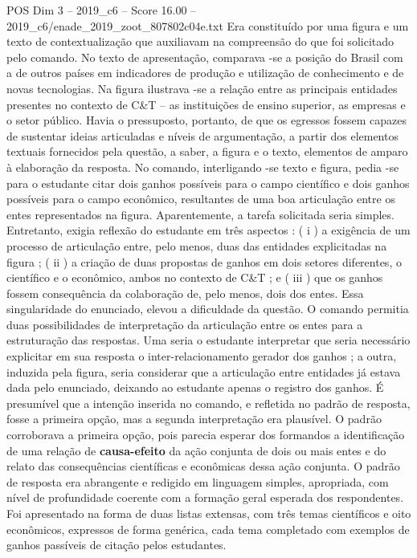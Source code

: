 \begin{textsample}{POS Dim 3 – 2019\_c6 – Score 16.00 – 2019\_c6/enade\_2019\_zoot\_807802c04e.txt}
Era constituído por uma figura e um texto de contextualização que auxiliavam na compreensão do que foi solicitado pelo comando.
No texto de apresentação, comparava -se a posição do Brasil com a de outros países em indicadores de produção e utilização de conhecimento e de novas tecnologias.
Na figura ilustrava -se a relação entre as principais entidades presentes no contexto de C\&T – as instituições de ensino superior, as empresas e o setor público.
Havia o pressuposto, portanto, de que os egressos fossem capazes de sustentar ideias articuladas e níveis de argumentação, a partir dos elementos textuais fornecidos pela questão, a saber, a figura e o texto, elementos de amparo à elaboração da resposta.
No comando, interligando -se texto e figura, pedia -se para o estudante citar dois ganhos possíveis para o campo científico e dois ganhos possíveis para o campo econômico, resultantes de uma boa articulação entre os entes representados na figura.
Aparentemente, a tarefa solicitada seria simples.
Entretanto, exigia reflexão do estudante em três aspectos : ( i ) a exigência de um processo de articulação entre, pelo menos, duas das entidades explicitadas na figura ; ( ii ) a criação de duas propostas de ganhos em dois setores diferentes, o científico e o econômico, ambos no contexto de C\&T ; e ( iii ) que os ganhos fossem consequência da colaboração de, pelo menos, dois dos entes.
Essa singularidade do enunciado, elevou a dificuldade da questão.
O comando permitia duas possibilidades de interpretação da articulação entre os entes para a estruturação das respostas.
Uma seria o estudante interpretar que seria necessário explicitar em sua resposta o inter-relacionamento gerador dos ganhos ; a outra, induzida pela figura, seria considerar que a articulação entre entidades já estava dada pelo enunciado, deixando ao estudante apenas o registro dos ganhos.
É presumível que a intenção inserida no comando, e refletida no padrão de resposta, fosse a primeira opção, mas a segunda interpretação era plausível.
O padrão corroborava a primeira opção, pois parecia esperar dos formandos a identificação de uma relação de \textbf{causa-efeito} da ação conjunta de dois ou mais entes e do relato das consequências científicas e econômicas dessa ação conjunta.
O padrão de resposta era abrangente e redigido em linguagem simples, apropriada, com nível de profundidade coerente com a formação geral esperada dos respondentes.
Foi apresentado na forma de duas listas extensas, com três temas científicos e oito econômicos, expressos de forma genérica, cada tema completado com exemplos de ganhos passíveis de citação pelos estudantes.

\end{textsample}
